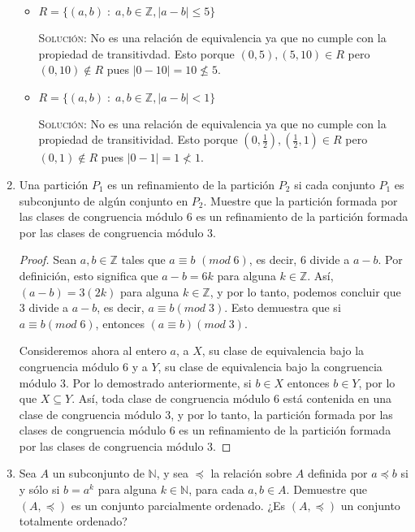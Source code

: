 \documentclass[letterpaper,11pt]{article}
\begin{document}
\begin{enumerate}
\begin{itemize}
        \item $R = \{(a,b) \; : \; a,b ∈ ℤ, |a-b| \leq 5\}$

        \textsc{Solución:} No es una relación de equivalencia ya que no cumple 
        con la propiedad de transitivdad. Esto porque $(0, 5), (5, 10) ∈ R$ 
        pero $(0, 10) ∉ R$ pues $|0 - 10| = 10 \not \leq 5$. 
        \item $R = \{(a,b) \; : \; a, b \in ℤ, |a-b| < 1\}$

        \textsc{Solución:} No es una relación de equivalencia ya que no cumple 
        con la propiedad de transitividad. Esto porque $(0, \frac{1}{2}), 
        (\frac{1}{2}, 1) ∈ R$ pero $(0, 1) ∉ R$ pues $|0 - 1| = 1 \not < 1$. 
    \end{itemize}

    \item Una partición $P_{1}$ es un refinamiento de la partición $P_{2}$ si 
    cada conjunto $P_{1}$ es subconjunto de algún conjunto en $P_{2}$. Muestre 
    que la partición formada por las clases de congruencia módulo $6$ es un 
    refinamiento de la partición formada por las clases de congruencia módulo 
    $3$.

    \begin{proof}
        Sean $a, b ∈ ℤ$ tales que $a ≡ b$ $(mod \; 6)$, es decir, $6$ divide a 
        $a - b$. Por definición, esto significa que $a - b = 6k$ para alguna 
        $k ∈ ℤ$. Así, $(a - b) = 3(2k)$ para alguna $k ∈ ℤ$, y por lo tanto,
        podemos concluir que $3$ divide a $a - b$, es decir, $a ≡ b (mod \; 3)$.
        Esto demuestra que si $a ≡ b (mod \; 6)$, entonces $(a ≡ b) (mod \; 3)$.

        Consideremos ahora al entero $a$, a $X$, su clase de equivalencia bajo
        la congruencia módulo $6$ y a $Y$, su clase de equivalencia bajo la 
        congruencia módulo $3$. Por lo demostrado anteriormente, si $b ∈ X$
        entonces $b ∈ Y$, por lo que $X ⊆ Y$. Así, toda clase de congruencia 
        módulo $6$ está contenida en una clase de congruencia módulo $3$, y 
        por lo tanto, la partición formada por las clases de congruencia módulo 
        $6$ es un refinamiento de la partición formada por las clases de 
        congruencia módulo $3$. 

    \end{proof}

    \item Sea $A$ un subconjunto de $ℕ$, y sea $\preceq$ la relación sobre $A$
    definida por $a \preceq b$ si y sólo si $b = a^{k}$ para alguna $k \in ℕ$,
    para cada $a,b \in A$. Demuestre que $(A, \preceq)$ es un conjunto 
    parcialmente ordenado. ¿Es $(A, \preceq)$ un conjunto totalmente ordenado?


\end{enumerate}
\end{document}
